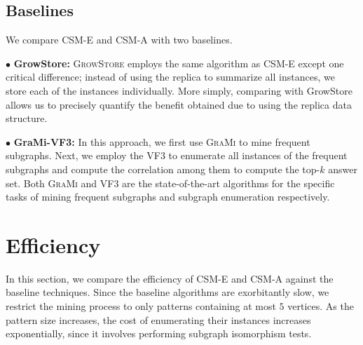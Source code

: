 \subsection{Baselines} We compare CSM-E and CSM-A with two baselines. %

$\bullet$ \textbf{GrowStore: } \textsc{GrowStore} employs the same algorithm as CSM-E except one critical difference; instead of using the replica to summarize all instances, we store each of the instances individually. More simply, comparing with GrowStore allows us to precisely quantify the benefit obtained due to using the replica data structure.

$\bullet$ \textbf{GraMi-VF3:} In this approach, we first use \textsc{GraMi}\cite{} to mine frequent subgraphs. Next, we employ the \textsc{VF3}\cite{} to enumerate all instances of the frequent subgraphs and compute the correlation among them to compute the top-$k$ answer set. Both \textsc{GraMi} and \textsc{VF3} are the state-of-the-art algorithms for the specific tasks of mining frequent subgraphs and subgraph enumeration respectively.

\section{Efficiency}
In this section, we compare the efficiency of CSM-E and CSM-A against the baseline techniques. Since the baseline algorithms are exorbitantly slow, we %
restrict the mining process to only patterns containing at most $5$ vertices. As the pattern size increases, the cost of enumerating their instances increases exponentially, since it involves performing subgraph isomorphism tests. 

